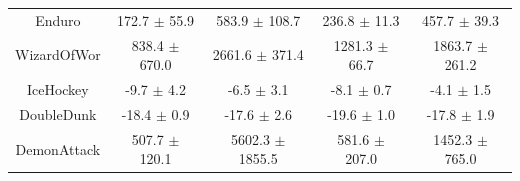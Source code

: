 \begin{table}[h]
\begin{tabular}{ccccc}
Enduro        &       172.7 $\pm$ 55.9 &     583.9 $\pm$ 108.7 &      236.8 $\pm$ 11.3 &      457.7 $\pm$ 39.3 \\
WizardOfWor   &      838.4 $\pm$ 670.0 &    2661.6 $\pm$ 371.4 &     1281.3 $\pm$ 66.7 &    1863.7 $\pm$ 261.2 \\
IceHockey     &         -9.7 $\pm$ 4.2 &        -6.5 $\pm$ 3.1 &        -8.1 $\pm$ 0.7 &        -4.1 $\pm$ 1.5 \\
DoubleDunk    &        -18.4 $\pm$ 0.9 &       -17.6 $\pm$ 2.6 &       -19.6 $\pm$ 1.0 &       -17.8 $\pm$ 1.9 \\
DemonAttack   &      507.7 $\pm$ 120.1 &   5602.3 $\pm$ 1855.5 &     581.6 $\pm$ 207.0 &    1452.3 $\pm$ 765.0 \\
\bottomrule
\end{tabular}
\end{table}

